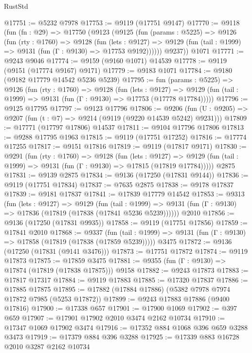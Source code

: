 \begin{lexlean}{RustStd}
\begin{coremodule}
@17751 := @5232 @7978
@17753 := @9119 (@17751 @9147)
@17770 := @9118
    (fun (fn : @29) =>
    @17750
      (@9123
        (@9125
          (fun (params : @5225) =>
          @9126
            (fun (rty : @1760) =>
            @9128
              (fun (lets : @9127) =>
              @9129 (fun (tail : @1999) => @9131 (fun (Γ : @9130) => @17753 @9192))))))
        @9237))
    @1071
@17771 := @9243 @9046
@17774 := @9159 (@9160 @1071) @14539
@17778 := @9119 (@9151 (@17774 @9167) @9171)
@17779 := @9183 @1071
@17784 := @9180 (@9182 @17779 @14542 @5236 @5239)
@17795 := fun (params : @5225) =>
  @9126
    (fun (rty : @1760) =>
    @9128
      (fun (lets : @9127) =>
      @9129 (fun (tail : @1999) => @9131 (fun (Γ : @9130) => @17753 (@17778 @17784)))))
@17796 := @9125 @17795
@17797 := @9123 @17796
@17806 := @9206
    (fun (U : @9205) => @9207 (fun (t : @7) => @9214 (@9119 (@9220 @14539 @5242) @9231)))
@17809 := @17771 (@17797 @17806) @14537
@17811 := @9104 @17796 @17806
@17813 := @9288 @17795 @1963
@17815 := @9119 (@17751 @17252)
@17816 := @17774 @17255
@17817 := @9151 @17816
@17819 := @9119 (@17817 @9171)
@17830 := @9291
    (fun (rty : @1760) =>
    @9128
      (fun (lets : @9127) =>
      @9129 (fun (tail : @1999) => @9131 (fun (Γ : @9130) => @17815 (@17819 @17784)))))
    @2875
@17831 := @9139 @2875
@17834 := @9136 (@17250 (@17831 @9144))
@17836 := @9119 (@17751 @17834)
@17837 := @7635 @2875
@17838 := @9178 @17837
@17839 := @9181 @17837
@17841 := @17839 @17779 @14542
@17853 := @9313
    (fun (lets : @9127) =>
    @9129
      (fun (tail : @1999) =>
      @9131 (fun (Γ : @9130) => @17836 (@17819 (@17838 (@17841 @5236 @5239))))))
    @2010
@17856 := @9136 (@17250 (@17831 @9935))
@17858 := @9119 (@17751 @17856)
@17859 := @17841 @2010
@17868 := @9337
    (fun (tail : @1999) => @9131 (fun (Γ : @9130) => @17858 (@17819 (@17838 (@17859 @5239)))))
    @3475
@17872 := @9136 (@17250 (@17831 (@9141 @3476)))
@17873 := @17751 @17872
@17874 := @9119 @17873
@17875 := @17859 @3475
@17881 := @9355 (fun (Γ : @9130) => @17874 (@17819 (@17838 @17875))) @9158
@17882 := @9243 @17873
@17883 := @17817 @17317
@17884 := @9119 @17883
@17885 := @17320 @17837
@17886 := @17885 @17875
@17895 := @17882 (@17884 @17886) (@5382 @7978 @7974 @17872 @7985 (@5253 @17872))
@17899 := @9243 @17883 @17886 (@9400 @17816)
@17900 := @17338 @657
@17901 := @17900 @1069
@17902 := @397 @659
@17907 := @17901 @17902 @2010 @3474 @2162 @10734
@17910 := @17347 @1069 @17902 @3474
@17916 := @17352 @884 @1068 @396 @659 @3288 @3473
@17919 := @17379 @884 @396 @3288
@17925 := @17339 @883 @16728 @2010 @3287 @2162 @10734

\end{coremodule}
\end{lexlean}
